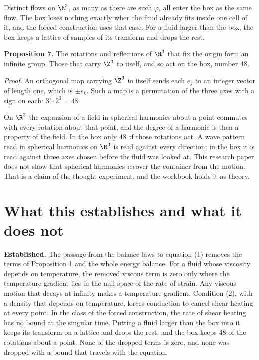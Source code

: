 Distinct flows on $\R^3$, as many as there are such $\varphi$, all enter the box as the same flow.
The box loses nothing exactly when the fluid already fits inside one cell of it, and the forced
construction uses that case. For a fluid larger than the box, the box keeps a lattice of samples of
its transform and drops the rest.

\textbf{Proposition 7.} The rotations and reflections of $\R^3$ that fix the origin form an infinite
group. Those that carry $\Z^3$ to itself, and so act on the box, number 48.

\emph{Proof.} An orthogonal map carrying $\Z^3$ to itself sends each $e_j$ to an integer vector of
length one, which is $\pm e_k$. Such a map is a permutation of the three axes with a sign on each:
$3!\cdot 2^3 = 48$. \hfill\qedsymbol

On $\R^3$ the expansion of a field in spherical harmonics about a point commutes with every
rotation about that point, and the degree of a harmonic is then a property of the field. In the box only
48 of those rotations act. A wave pattern read in spherical harmonics on $\R^3$ is read against
every direction; in the box it is read against three axes chosen before the fluid was looked at.
This research paper does not show that spherical harmonics recover the container from the motion.
That is a claim of the thought experiment, and the workbook holds it as theory.

\section{What this establishes and what it does not}

\textbf{Established.} The passage from the balance laws to equation (1) removes the terms of
Proposition 1 and the whole energy balance. For a fluid whose viscosity depends on temperature,
the removed viscous term is zero only where the temperature gradient lies in the null space of the
rate of strain. Any viscous motion that decays at infinity makes a temperature gradient. Condition
(2), with a density that depends on temperature, forces conduction to cancel shear heating at every
point. In the class of the forced construction, the rate of shear heating has no bound at the
singular time. Putting a fluid larger than the box into it keeps its transform on a lattice and
drops the rest, and the box keeps 48 of the rotations about a point. None of the dropped terms is
zero, and none was dropped with a bound that travels
with the equation.

